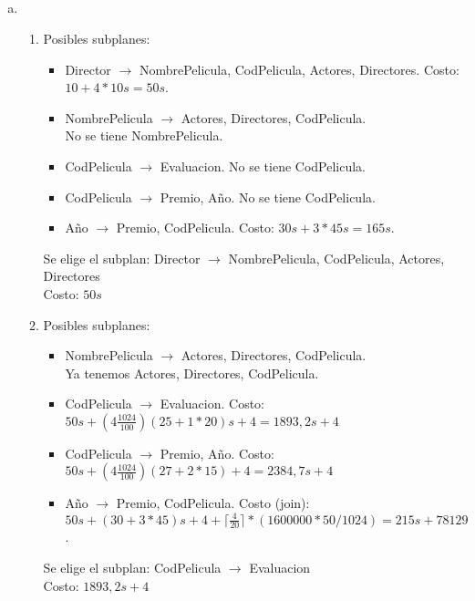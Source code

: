 \documentclass[10pt]{article}
\begin{document}
\subsection{}

\begin{enumerate}[a.]
 \item 

 \begin{enumerate}[1:]
  \item Posibles subplanes:
    \begin{itemize}
     \item Director $\rightarrow$  NombrePelicula, CodPelicula, Actores, Directores. Costo: $10+4*10s = 50s$.
     \item NombrePelicula $\rightarrow$ Actores, Directores, CodPelicula. \\
           No se tiene NombrePelicula.
     \item CodPelicula $\rightarrow$  Evaluacion. No se tiene CodPelicula.
     \item CodPelicula $\rightarrow$  Premio, Año. No se tiene CodPelicula.
     \item Año $\rightarrow$ Premio, CodPelicula. Costo: $30s+3*45s = 165s$.
    \end{itemize}
 
     Se elige el subplan: Director $\rightarrow$  NombrePelicula, CodPelicula, Actores, Directores \\
     Costo: $50s$

 \item Posibles subplanes:
    \begin{itemize}
     \item NombrePelicula $\rightarrow$ Actores, Directores, CodPelicula. \\
     Ya tenemos Actores, Directores, CodPelicula.
     \item CodPelicula $\rightarrow$  Evaluacion. Costo: $50s+(4\frac{1024}{100})(25+1*20)s+4 = 1893,2s+4$
     \item CodPelicula $\rightarrow$  Premio, Año. Costo: $50s+(4\frac{1024}{100})(27+2*15)+4 = 2384,7s+4$
     \item Año $\rightarrow$ Premio, CodPelicula. Costo (join): $50s+(30+3*45)s+4+\lceil \frac{4}{20} \rceil*(1600000*50/1024) = 215s+78129$.
    \end{itemize}

    Se elige el subplan: CodPelicula $\rightarrow$  Evaluacion \\
    Costo: $1893,2s+4$


\end{enumerate}
\end{enumerate}
\end{document}
